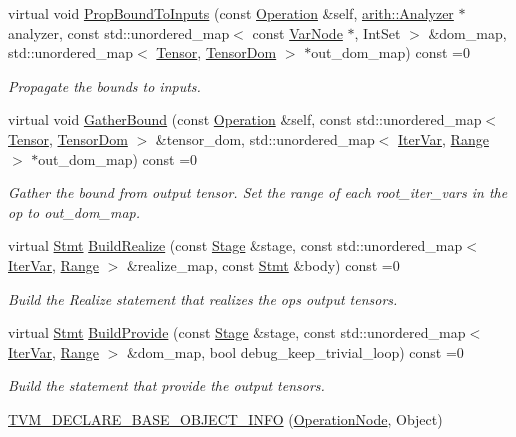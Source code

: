 \begin{DoxyCompactItemize}
virtual void \hyperlink{classtvm_1_1te_1_1OperationNode_a3c32a93264e0d627d8389b703edcaf49}{Prop\+Bound\+To\+Inputs} (const \hyperlink{classtvm_1_1te_1_1Operation}{Operation} \&self, \hyperlink{classtvm_1_1arith_1_1Analyzer}{arith\+::\+Analyzer} $\ast$analyzer, const std\+::unordered\+\_\+map$<$ const \hyperlink{classtvm_1_1tir_1_1VarNode}{Var\+Node} $\ast$, Int\+Set $>$ \&dom\+\_\+map, std\+::unordered\+\_\+map$<$ \hyperlink{classtvm_1_1te_1_1Tensor}{Tensor}, \hyperlink{structtvm_1_1te_1_1TensorDom}{Tensor\+Dom} $>$ $\ast$out\+\_\+dom\+\_\+map) const =0
\begin{DoxyCompactList}\small\item\em Propagate the bounds to inputs. \end{DoxyCompactList}\item 
virtual void \hyperlink{classtvm_1_1te_1_1OperationNode_a278d1f242176ff48cc150532a9172aee}{Gather\+Bound} (const \hyperlink{classtvm_1_1te_1_1Operation}{Operation} \&self, const std\+::unordered\+\_\+map$<$ \hyperlink{classtvm_1_1te_1_1Tensor}{Tensor}, \hyperlink{structtvm_1_1te_1_1TensorDom}{Tensor\+Dom} $>$ \&tensor\+\_\+dom, std\+::unordered\+\_\+map$<$ \hyperlink{classtvm_1_1tir_1_1IterVar}{Iter\+Var}, \hyperlink{classtvm_1_1Range}{Range} $>$ $\ast$out\+\_\+dom\+\_\+map) const =0
\begin{DoxyCompactList}\small\item\em Gather the bound from output tensor. Set the range of each root\+\_\+iter\+\_\+vars in the op to out\+\_\+dom\+\_\+map. \end{DoxyCompactList}\item 
virtual \hyperlink{classtvm_1_1tir_1_1Stmt}{Stmt} \hyperlink{classtvm_1_1te_1_1OperationNode_afc89a6b2f5e35adf79c3587a95ba283a}{Build\+Realize} (const \hyperlink{classtvm_1_1te_1_1Stage}{Stage} \&stage, const std\+::unordered\+\_\+map$<$ \hyperlink{classtvm_1_1tir_1_1IterVar}{Iter\+Var}, \hyperlink{classtvm_1_1Range}{Range} $>$ \&realize\+\_\+map, const \hyperlink{classtvm_1_1tir_1_1Stmt}{Stmt} \&body) const =0
\begin{DoxyCompactList}\small\item\em Build the Realize statement that realizes the op\textquotesingle{}s output tensors. \end{DoxyCompactList}\item 
virtual \hyperlink{classtvm_1_1tir_1_1Stmt}{Stmt} \hyperlink{classtvm_1_1te_1_1OperationNode_a0a4a33f450e0e0890f59af9464c9015f}{Build\+Provide} (const \hyperlink{classtvm_1_1te_1_1Stage}{Stage} \&stage, const std\+::unordered\+\_\+map$<$ \hyperlink{classtvm_1_1tir_1_1IterVar}{Iter\+Var}, \hyperlink{classtvm_1_1Range}{Range} $>$ \&dom\+\_\+map, bool debug\+\_\+keep\+\_\+trivial\+\_\+loop) const =0
\begin{DoxyCompactList}\small\item\em Build the statement that provide the output tensors. \end{DoxyCompactList}\item 
\hyperlink{classtvm_1_1te_1_1OperationNode_a281dd659ac061a77c5783bd0e42324df}{T\+V\+M\+\_\+\+D\+E\+C\+L\+A\+R\+E\+\_\+\+B\+A\+S\+E\+\_\+\+O\+B\+J\+E\+C\+T\+\_\+\+I\+N\+FO} (\hyperlink{classtvm_1_1te_1_1OperationNode}{Operation\+Node}, Object)
\end{DoxyCompactItemize}

